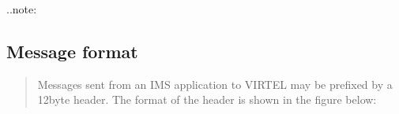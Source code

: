 \documentclass[letterpaper,10pt,english]{sphinxmanual}
\begin{document}
\sphinxAtStartPar
{}

\sphinxAtStartPar
..note:

\begin{sphinxVerbatim}[commandchars=\\\{\}]
           
\end{sphinxVerbatim}

\ignorespaces 

\subsection{Message format}
\label{\detokenize{connectivity_guide:message-format}}\label{\detokenize{connectivity_guide:index-27}}\begin{quote}

\sphinxAtStartPar
Messages sent from an IMS application to VIRTEL may be prefixed by a 12\sphinxhyphen{}byte header. The format of the header is shown in the figure below:
\end{quote}
\end{document}
